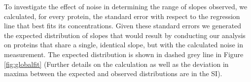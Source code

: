 To investigate the effect of noise in determining the range of slopes observed, we calculated, for every protein, the standard error with respect to the regression line that best fits its concentrations.
Given these standard errors we generated the expected distribution of slopes that would result by conducting our analysis on proteins that share a single, identical slope, but with the calculated noise in measurement.
The expected distribution is shown in dashed grey line in Figure \ref{fig:globalfit} (Further details on the calculation as well as the deviation in maxima between the expected and observed distributions are in the SI).